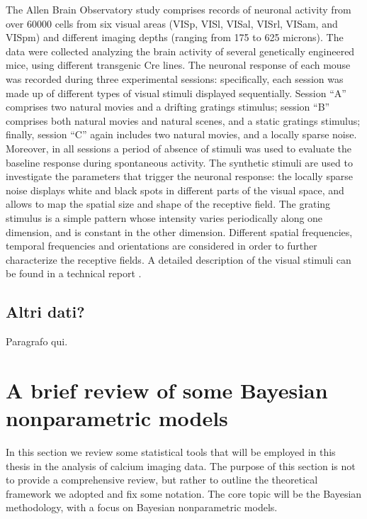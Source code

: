 The Allen Brain Observatory study comprises records of neuronal activity from over $60000$ cells from six visual areas (VISp, VISl, VISal, VISrl, VISam, and VISpm) and different imaging depths (ranging from 175 to 625 microns). The data were collected analyzing the brain activity of several genetically engineered mice, using different transgenic Cre lines.
The neuronal response of each mouse was recorded during three experimental sessions: specifically, each session was made up of different types of visual stimuli displayed sequentially.
Session ``A'' comprises two natural movies and a drifting gratings stimulus; session ``B'' comprises both natural movies and natural scenes, and a static gratings stimulus; finally, session ``C'' again includes two natural movies, and a locally sparse noise. Moreover, in all sessions a period of absence of stimuli was used to evaluate the baseline response during spontaneous activity.
The synthetic stimuli are used to investigate the parameters that trigger the neuronal response: the locally sparse noise displays white and black spots in different parts of the visual space, and allows to map the spatial size and shape of the receptive field. The grating stimulus is a simple pattern whose intensity varies periodically along one dimension, and is constant in the other dimension. Different spatial frequencies, temporal frequencies and orientations are considered in order to further characterize the receptive fields. A detailed description of the visual stimuli can be found in a technical report \citep{allen_stimulus}.





\subsection{Altri dati?}
Paragrafo qui.
















\section{A brief review of some Bayesian nonparametric models} 
In this section we review some statistical tools that will be employed in this thesis in the analysis of calcium imaging data. The purpose of this section is not to provide a comprehensive review, but rather to outline the theoretical framework we adopted and fix some notation.
The core topic will be the Bayesian methodology, with a focus on Bayesian nonparametric models.


